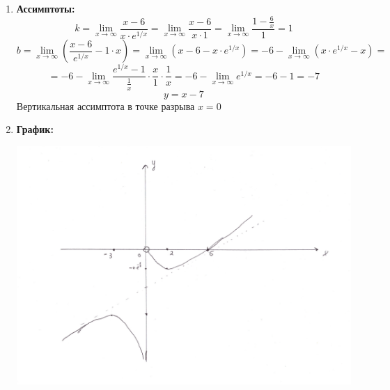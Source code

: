 \documentclass[a4paper,12pt]{article}
\begin{document}
\begin{enumerate}
\begin{center}
\end{center} 
\item \textbf{Ассимптоты:}
\[
k = \lim_{x \rightarrow \infty} \frac{x-6}{x \cdot e^{1/x}} = \lim_{x \rightarrow \infty} \frac{x-6}{x \cdot 1} = \lim_{x \rightarrow \infty} \frac{1 - \frac{6}{x}}{1} = 1
\]
\[
b = \lim_{x \rightarrow \infty} \left( \frac{x-6}{e^{1/x}} - 1 \cdot x \right) = \lim_{x \rightarrow \infty} \left(x -6 - x \cdot e^{1/x} \right) = -6 - \lim_{x \rightarrow \infty} \left(  x \cdot e^{1/x}  - x\right) = 
\]
\[
= - 6 - \lim_{x \rightarrow \infty} \frac{e^{1/x} -1}{\frac{1}{x}} \cdot \frac{x}{1} \cdot \frac{1}{x} = - 6- \lim_{x \rightarrow \infty}e^{1/x} = -6 -1 = -7
\]
\[
y = x - 7
\]
Вертикальная ассимптота в точке разрыва $ x = 0$
\item \textbf{График:}
\begin{center}
\includegraphics[scale=0.6]{grah4.png}
\end{center}
\end{enumerate}
\end{document}
